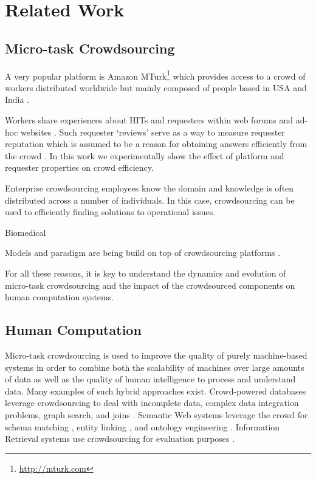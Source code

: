 \section{Related Work}\label{sec:relwork}

\subsection{Micro-task Crowdsourcing}

A very popular platform is Amazon MTurk\footnote{\url{http://mturk.com}} which provides access to a crowd of workers distributed worldwide but mainly composed of people based in USA and India \cite{mturk}.

Workers share experiences about HITs and requesters within web forums and ad-hoc websites \cite{turkopticon}. Such requester `reviews' serve as a way to measure requester reputation which is assumed to be a reason for obtaining answers efficiently from the crowd \cite{}. In this work we experimentally show the effect of platform and requester properties on crowd efficiency.  

Enterprise crowdsourcing \cite{enterprisecrowdsourcing} employees know the domain and knowledge is often distributed across a number of individuals. In this case, crowdsourcing can be used to efficiently finding solutions to operational issues.

Biomedical \cite{biomedical}


Models and paradigm are being build on top of crowdsourcing platforms \cite{crowdcomputer}.

For all these reasons, it is key to understand the dynamics and evolution of micro-task crowdsourcing and the impact of the crowdsourced components on human computation systems.

\subsection{Human Computation}
Micro-task crowdsourcing is used to improve the quality of purely machine-based systems in order to combine both the scalability of machines over large amounts of data as well as the quality of human intelligence to process and understand data.
Many examples of such hybrid approaches exist.
Crowd-powered databases \cite{crowddb} leverage crowdsourcing to deal with incomplete data, complex data integration problems, graph search, and joins \cite{crowder,graphsearch,crowdjoins}.
Semantic Web systems leverage the crowd for schema matching \cite{crowdmap}, entity linking \cite{zencrowd}, and ontology engineering \cite{bioonto}.
Information Retrieval systems use crowdsourcing for evaluation purposes \cite{mizzaroalonso}.

